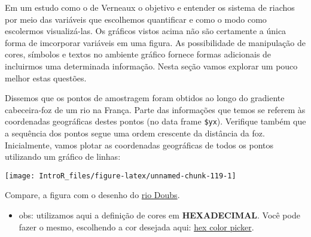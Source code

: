 \documentclass[
]{book}
\newenvironment{Shaded}{\begin{snugshade}}{\end{snugshade}}
\newcommand{\DataTypeTok}[1]{\textcolor[rgb]{0.13,0.29,0.53}{#1}}
\newcommand{\DecValTok}[1]{\textcolor[rgb]{0.00,0.00,0.81}{#1}}
\newcommand{\KeywordTok}[1]{\textcolor[rgb]{0.13,0.29,0.53}{\textbf{#1}}}
\newcommand{\NormalTok}[1]{#1}
\newcommand{\OperatorTok}[1]{\textcolor[rgb]{0.81,0.36,0.00}{\textbf{#1}}}
\newcommand{\StringTok}[1]{\textcolor[rgb]{0.31,0.60,0.02}{#1}}
\providecommand{\tightlist}{%
  \setlength{\itemsep}{0pt}\setlength{\parskip}{0pt}}
\begin{document}
Em um estudo como o de Verneaux \citep{Verneaux1973} o objetivo e entender os sistema de riachos por meio das variáveis que escolhemos quantificar e como o modo como escolermos visualizá-las. Os gráficos vistos acima não são certamente a única forma de imcorporar variáveis em uma figura. As possibilidade de manipulação de cores, símbolos e textos no ambiente gráfico fornece formas adicionais de incluirmos uma determinada informação. Nesta seção vamos explorar um pouco melhor estas questões.

Dissemos que os pontos de amostragem foram obtidos ao longo do gradiente cabeceira-foz de um rio na França. Parte das informações que temos se referem às coordenadas geográficas destes pontos (no data frame \texttt{\$yx}). Verifique também que a sequência dos pontos segue uma ordem crescente da distância da foz. Inicialmente, vamos plotar as coordenadas geográficas de todos os pontos utilizando um gráfico de linhas:

\begin{Shaded}
\end{Shaded}

\begin{center}\texttt{[image: IntroR\_files/figure-latex/unnamed-chunk-119-1]} \end{center}

Compare, a figura com o desenho do \href{https://pt.wikipedia.org/wiki/Rio_Doubs}{rio Doubs}.

\begin{itemize}
\tightlist
\item
  obs: utilizamos aqui a definição de cores em \textbf{HEXADECIMAL}. Você pode fazer o mesmo, escolhendo a cor desejada aqui: \href{https://www.google.com/search?q=hex+color+picker\&oq=hex+color+picker\&aqs=chrome..69i57j0l7.11304j0j4\&sourceid=chrome\&ie=UTF-8}{hex color picker}.
\end{itemize}
\end{document}
